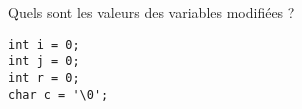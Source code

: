 \documentclass[french,a4paper,addpoints,11pt]{exam}
\begin{document}
\begin{questions}


    \question Quels sont les valeurs des variables modifiées ?

    \begin{lstlisting}
int i = 0;
int j = 0;
int r = 0;
char c = '\0';
\end{lstlisting}


\end{questions}
\end{document}
